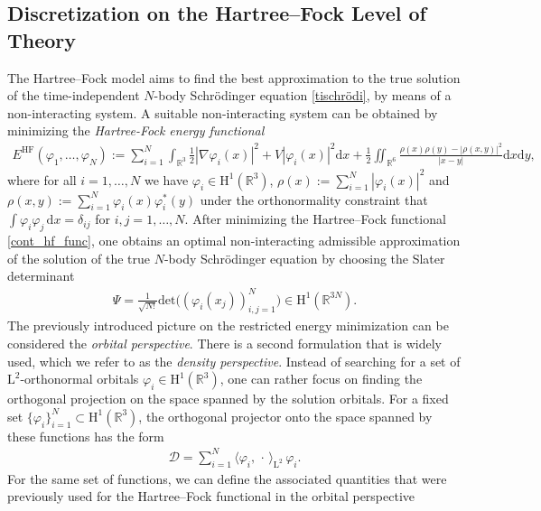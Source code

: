 \documentclass[reqno]{amsart}
\begin{document}
\subsection{Discretization on the Hartree–Fock Level of Theory}\label{disc_HF_Theory}
The Hartree–Fock model aims to find the best approximation to the true solution of the time-independent $N$-body Schrödinger equation \eqref{tischrödi}, by means of a non-interacting system. A suitable non-interacting  system can be obtained by minimizing the \textit{Hartree-Fock energy functional}
\begin{align}\label{cont_hf_func}
    E^{\mathrm{HF}}(\varphi_1,\ldots,\varphi_N):=\sum^N_{i=1}\int_{\mathbb{R}^3}\frac{1}{2}|\nabla \varphi_i(x)|^2+V|\varphi_i(x)|^2\mathrm{d}x +\frac{1}{2}\iint_{\mathbb{R}^6}\frac{\rho(x)\rho(y)-|\rho(x,y)|^2}{|x-y|}\mathrm{d}x\mathrm{d}y,
\end{align}
where for all $i=1,\ldots,N$ we have $\varphi_i\in \mathrm{H}^1(\mathbb{R}^3)$, $\rho(x):=\sum^{N}_{i=1}|\varphi_i(x)|^2$ and $\rho(x,y):=\sum^N_{i=1}\varphi_i(x)\varphi^*_i(y)$ under the orthonormality constraint that $\int \varphi_i\varphi_j\,\mathrm{d}x =\delta_{ij}$ for $i,j=1,\ldots, N$.
After minimizing the Hartree–Fock functional \eqref{cont_hf_func}, one obtains an optimal non-interacting admissible approximation of the solution of the true $N$-body Schrödinger equation by choosing the Slater determinant \begin{align}\label{HF_slater}
    \Psi=\frac{1}{\sqrt{N!}}\mathrm{det}\big((\varphi_i(x_j))_{i,j=1}^N\big)\in \mathrm{H}^1(\mathbb{R}^{3N}).
\end{align}
The previously introduced picture on the restricted energy minimization can be considered the \textit{orbital perspective}. There is a second formulation that is widely used, which we refer to as the \textit{density perspective}. Instead of searching for a set of $\mathrm{L}^2$-orthonormal orbitals $\varphi_i \in \mathrm{H}^1(\mathbb{R}^3)$, one can rather focus on finding the orthogonal projection on the space spanned by the solution orbitals. For a fixed set $\lbrace \varphi_i\rbrace^N_{i=1}\subset \mathrm{H}^1(\mathbb{R}^3)$, the orthogonal projector onto the space spanned by these functions has the form
\begin{align*}
    \mathscr{D}=\sum_{i=1}^N \langle\varphi_i,\,\cdot\, \rangle_{\mathrm{L}^2}\,\varphi_i.
\end{align*}
For the same set of functions, we can define the associated quantities that were previously used for the Hartree–Fock functional in the orbital perspective
\end{document}
